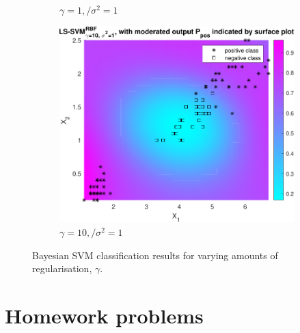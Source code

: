 \documentclass{article}
\begin{document}
\begin{figure}[h]
\begin{subfigure}[b]{0.3\textwidth}
                    \caption{$\gamma = 1,/ \sigma^2 = 1$}
                     \label{fig:bayes_5}
                 \end{subfigure}
                 \hfill
                 \begin{subfigure}[b]{0.3\textwidth}
                     \centering
                     \includegraphics[width=\textwidth]{Assignment 1/figures/bayes_rbf_gamma_10_sig2_1.pdf}
                    \caption{$\gamma = 10,/ \sigma^2 = 1$}
                     \label{fig:bayes_6}
                 \end{subfigure}
                \caption{Bayesian SVM classification results for varying amounts of regularisation, $\gamma$.}
            \end{figure}
        
\section{Homework problems}
\end{document}
